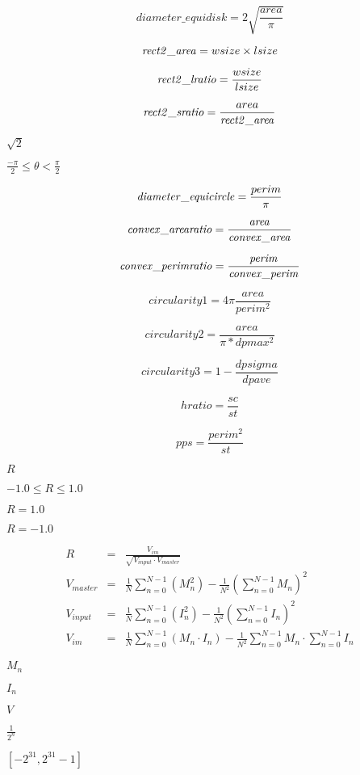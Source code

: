 \documentclass{article}
\begin{document}
\[diameter\_equidisk = 2 \sqrt{ \frac{area}{\pi} }\]
\pagebreak

\[{\it rect2\_area} = wsize \times lsize \]
\pagebreak

\[{\it rect2\_lratio} = \frac{wsize}{lsize}\]
\pagebreak

\[{\it rect2\_sratio} = \frac{area}{\it rect2\_area}\]
\pagebreak

$\sqrt{2}$
\pagebreak

$ \frac{-\pi}{2} \le \theta < \frac{\pi}{2}$
\pagebreak

\[{\it diameter\_equicircle} = \frac{perim}{\pi}\]
\pagebreak

\[{\it convex\_arearatio} = \frac{\it area}{\it convex\_area}\]
\pagebreak

\[{\it convex\_perimratio} = \frac{\it perim}{\it convex\_perim}\]
\pagebreak

\[circularity1 = 4\pi \frac{area}{perim^2} \]
\pagebreak

\[circularity2 = \frac{area}{\pi * dpmax^2} \]
\pagebreak

\[circularity3 = 1-\frac{dpsigma}{dpave} \]
\pagebreak

\[ hratio = \frac{sc}{st} \]
\pagebreak

\[ pps = \frac{perim^2}{st} \]
\pagebreak

$R$
\pagebreak

$-1.0 \leq R \leq 1.0$
\pagebreak

$ R = 1.0 $
\pagebreak

$ R= -1.0 $
\pagebreak

\begin{eqnarray*} R &=& \frac{ V_{im} }{ \sqrt{ V_{input} \cdot V_{master} } }\\ V_{master} &=& \frac{1}{N}\sum_{n = 0}^{N-1}(M_n ^2) - \frac{1}{N^2}( \sum_{n = 0}^{N-1}M_n )^2\\ V_{input} &=& \frac{1}{N}\sum_{n = 0}^{N-1}(I_n ^2) - \frac{1}{N^2}( \sum_{n = 0}^{N-1}I_n )^2\\ V_{im} &=& \frac{1}{N}\sum_{n = 0}^{N-1}(M_n \cdot I_n) - \frac{1}{N^2} \sum_{n = 0}^{N-1}M_n \cdot \sum_{n = 0}^{N-1}I_n \end{eqnarray*}
\pagebreak

$M_n$
\pagebreak

$I_n$
\pagebreak

$V$
\pagebreak

$\frac{1}{2^{n}}$
\pagebreak

$[-2^{31}, 2^{31}-1]$
\pagebreak
\end{document}
